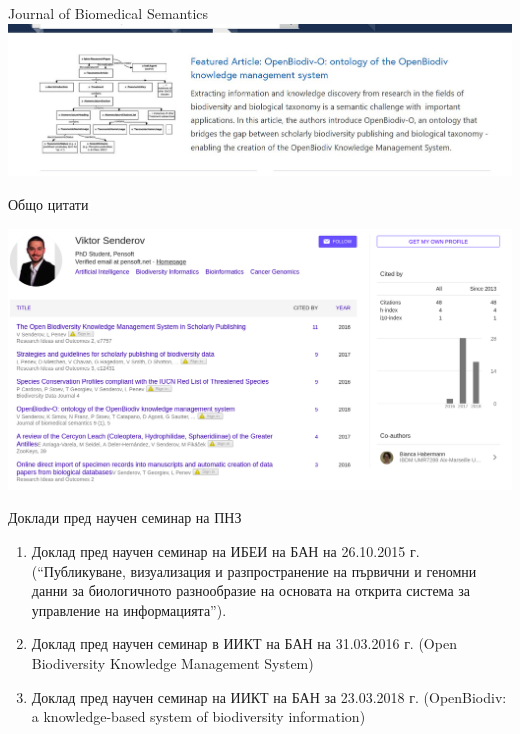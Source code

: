 \documentclass[bulgarian]{beamer}
\begin{document}
\begin{frame}{Journal of Biomedical Semantics}
\centering
\includegraphics[width=\textwidth]{Figures/JBS-featured.jpg}
\decoRule
\\
\caption{Статията за OpenBiodiv-O е на началната страница JBS}
\label{fig:jbs-featured}
\end{frame}


\begin{frame}{Общо цитати}

\centering
\includegraphics[width=\textwidth]{Figures/Google-scholar.png}

\end{frame}



\begin{frame}{Доклади пред научен семинар на ПНЗ}

\begin{enumerate}
    \item Доклад пред научен семинар на ИБЕИ на БАН на 26.10.2015 г. (``Публикуване, визуализация и разпространение на първични и геномни данни за биологичното разнообразие на основата на открита система за управление на информацията'').
    \item Доклад пред научен семинар в ИИКТ на БАН на 31.03.2016 г. (Open Biodiversity Knowledge Management System)
    \item Доклад пред научен семинар на ИИКТ на БАН за 23.03.2018 г. (OpenBiodiv: a knowledge-based system of biodiversity information)
\end{enumerate}

\end{frame}
\end{document}
